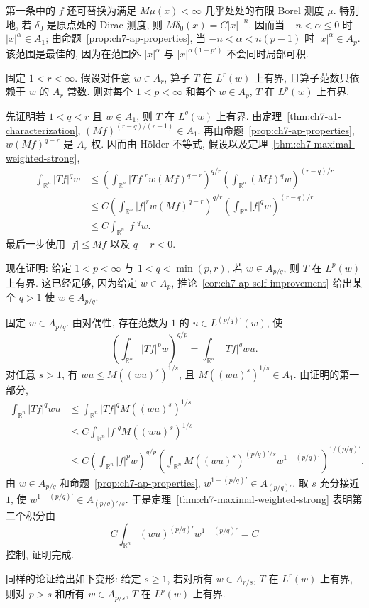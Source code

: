 第一条中的 $f$ 还可替换为满足 $M\mu(x)<\infty$ 几乎处处的有限 Borel 测度 $\mu$. 特别地, 若 $\delta_0$ 是原点处的 Dirac 测度, 则 $M\delta_0(x)=C|x|^{-n}$. 因而当 $-n<\alpha\le0$ 时 $|x|^\alpha\in A_1$; 由命题~\ref{prop:ch7-ap-properties}, 当 $-n<\alpha<n(p-1)$ 时 $|x|^\alpha\in A_p$. 该范围是最佳的, 因为在范围外 $|x|^\alpha$ 与 $|x|^{\alpha(1-p')}$ 不会同时局部可积.

\begin{Theorem}
\label{thm:ch7-rubio-de-francia-extrapolation}
固定 $1<r<\infty$. 假设对任意 $w\in A_r$, 算子 $T$ 在 $L^r(w)$ 上有界, 且算子范数只依赖于 $w$ 的 $A_r$ 常数. 则对每个 $1<p<\infty$ 和每个 $w\in A_p$, $T$ 在 $L^p(w)$ 上有界.
\end{Theorem}

\begin{Proof}
先证明若 $1<q<r$ 且 $w\in A_1$, 则 $T$ 在 $L^q(w)$ 上有界. 由定理~\ref{thm:ch7-a1-characterization}, $(Mf)^{(r-q)/(r-1)}\in A_1$. 再由命题~\ref{prop:ch7-ap-properties}, $w(Mf)^{q-r}$ 是 $A_r$ 权. 因而由 Hölder 不等式, 假设以及定理~\ref{thm:ch7-maximal-weighted-strong},
\[
\begin{aligned}
 \int_{\mathbb R^n}|Tf|^qw
 &\le\left(\int_{\mathbb R^n}|Tf|^rw(Mf)^{q-r}\right)^{q/r}
 \left(\int_{\mathbb R^n}(Mf)^qw\right)^{(r-q)/r}\\
 &\le C\left(\int_{\mathbb R^n}|f|^rw(Mf)^{q-r}\right)^{q/r}
 \left(\int_{\mathbb R^n}|f|^qw\right)^{(r-q)/r}\\
 &\le C\int_{\mathbb R^n}|f|^qw.
\end{aligned}
\]
最后一步使用 $|f|\le Mf$ 以及 $q-r<0$.

\hypertarget{chapter-07-page-154}{}
现在证明: 给定 $1<p<\infty$ 与 $1<q<\min(p,r)$, 若 $w\in A_{p/q}$, 则 $T$ 在 $L^p(w)$ 上有界. 这已经足够, 因为给定 $w\in A_p$, 推论~\ref{cor:ch7-ap-self-improvement} 给出某个 $q>1$ 使 $w\in A_{p/q}$.

固定 $w\in A_{p/q}$. 由对偶性, 存在范数为 $1$ 的 $u\in L^{(p/q)'}(w)$, 使
\[
 \left(\int_{\mathbb R^n}|Tf|^pw\right)^{q/p}
 =\int_{\mathbb R^n}|Tf|^qwu.
\]
对任意 $s>1$, 有 $wu\le M((wu)^s)^{1/s}$, 且 $M((wu)^s)^{1/s}\in A_1$. 由证明的第一部分,
\[
\begin{aligned}
 \int_{\mathbb R^n}|Tf|^qwu
 &\le\int_{\mathbb R^n}|Tf|^qM((wu)^s)^{1/s}\\
 &\le C\int_{\mathbb R^n}|f|^qM((wu)^s)^{1/s}\\
 &\le C\left(\int_{\mathbb R^n}|f|^pw\right)^{q/p}
 \left(\int_{\mathbb R^n}M((wu)^s)^{(p/q)'/s}
 w^{1-(p/q)'}\right)^{1/(p/q)'}.
\end{aligned}
\]
由 $w\in A_{p/q}$ 和命题~\ref{prop:ch7-ap-properties}, $w^{1-(p/q)'}\in A_{(p/q)'}$. 取 $s$ 充分接近 $1$, 使 $w^{1-(p/q)'}\in A_{(p/q)'/s}$. 于是定理~\ref{thm:ch7-maximal-weighted-strong} 表明第二个积分由
\[
 C\int_{\mathbb R^n}(wu)^{(p/q)'}w^{1-(p/q)'}=C
\]
控制, 证明完成.
\end{Proof}

同样的论证给出如下变形: 给定 $s\ge1$, 若对所有 $w\in A_{r/s}$, $T$ 在 $L^r(w)$ 上有界, 则对 $p>s$ 和所有 $w\in A_{p/s}$, $T$ 在 $L^p(w)$ 上有界.
